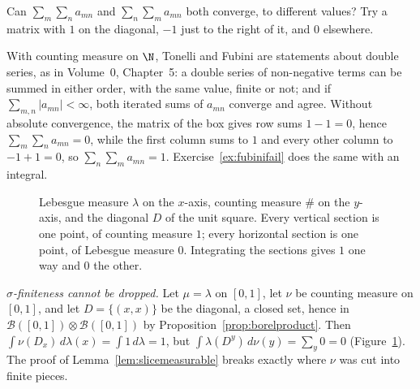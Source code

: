 \begin{think}
Can $\sum_m\sum_na_{mn}$ and $\sum_n\sum_ma_{mn}$ both converge, to different values? Try a matrix with $1$ on the diagonal, $-1$ just to the right of it, and $0$ elsewhere.
\end{think}

With counting measure on $\N$, Tonelli and Fubini are statements about double series, as in Volume~0, Chapter~5: a double series of non-negative terms can be summed in either order, with the
same value, finite or not; and if $\sum_{m,n}|a_{mn}|<\infty$, both iterated sums of $a_{mn}$ converge and agree. Without absolute convergence, the matrix of the box gives row sums $1-1=0$, hence
$\sum_m\sum_na_{mn}=0$, while the first column sums to $1$ and every other column to $-1+1=0$, so $\sum_n\sum_ma_{mn}=1$. Exercise~\ref{ex:fubinifail} does the same with an integral.

\begin{figure}[ht]
\centering
{}
\caption{Lebesgue measure $\lambda$ on the $x$-axis, counting measure $\#$ on the $y$-axis, and the diagonal $D$ of the unit square. Every vertical section is one point, of counting measure $1$; every
horizontal section is one point, of Lebesgue measure $0$. Integrating the sections gives $1$ one way and $0$ the other.}
\label{fig:diagcount}
\end{figure}

\emph{$\sigma$-finiteness cannot be dropped.} Let $\mu=\lambda$ on $[0,1]$, let $\nu$ be counting measure on $[0,1]$, and let $D=\{(x,x)\}$ be the diagonal, a closed set, hence in $\mathcal B([0,1])\otimes\mathcal B([0,1])$ by
Proposition~\ref{prop:borelproduct}. Then $\int\nu(D_x)\,d\lambda(x)=\int1\,d\lambda=1$, but $\int\lambda(D^y)\,d\nu(y)=\sum_y0=0$ (Figure~\ref{fig:diagcount}). The proof of Lemma~\ref{lem:slicemeasurable} breaks exactly where $\nu$ was
cut into finite pieces.


